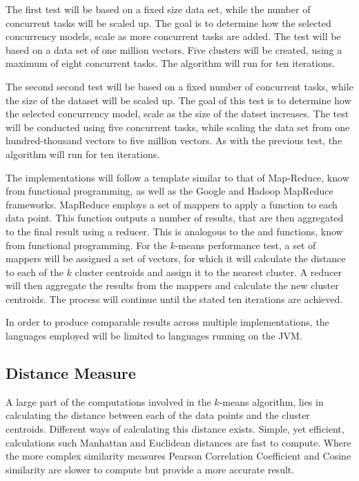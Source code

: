 The first test will be based on a fixed size data set, while the number of concurrent tasks will be scaled up. The goal is to determine how the selected concurrency models, scale as more concurrent tasks are added. The test will be based on a data set of one million vectors. Five clusters will be created, using a maximum of eight concurrent tasks. The algorithm will run for ten iterations.

The second second test will be based on a fixed number of concurrent tasks, while the size of the dataset will be scaled up. The goal of this test is to determine how the selected concurrency model, scale as the size of the datset increases. The test will be conducted using five concurrent tasks, while scaling the data set from one hundred-thousand vectors to five million vectors. As with the previous test, the algorithm will run for ten iterations.

The implementations will follow a template similar to that of Map-Reduce\cite{dean2008mapreduce}, know from functional programming, as well as the Google and Hadoop MapReduce frameworks. MapReduce employs a set of mappers to apply a function to each data point. This function outputs a number of results, that are then aggregated to the final result using a reducer. This is analogous to the  and  functions, know from functional programming. For the $k$-means performance test, a set of mappers will be assigned a set of vectors, for which it will calculate the distance to each of the $k$ cluster centroids and assign it to the nearest cluster. A reducer will then aggregate the results from the mappers and calculate the new cluster centroids. The process will continue until the stated ten iterations are achieved.

In order to produce comparable results across multiple implementations, the languages employed will be limited to languages running on the \ac{JVM}.

\subsection{Distance Measure}
A large part of the computations involved in the $k$-means algorithm, lies in calculating the distance between each of the data points and the cluster centroids. Different ways of calculating this distance exists. Simple, yet efficient, calculations such  Manhattan and Euclidean\cite[p. 41]{amatriain2011data} distances are fast to compute. Where the more complex similarity measures Pearson Correlation Coefficient and Cosine similarity\cite[p. 42]{amatriain2011data}\cite{breese1998empirical} are slower to compute but provide a more accurate result.

